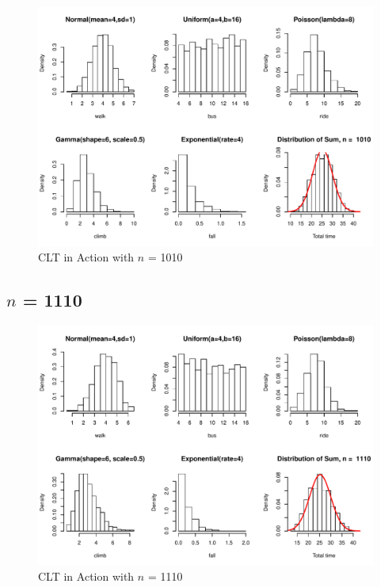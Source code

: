 \documentclass[11pt,letter]{article}\usepackage[]{graphicx}\usepackage[]{color}
\makeatletter
\def\maxwidth{ %
  \ifdim\Gin@nat@width>\linewidth
    \linewidth
  \else
    \Gin@nat@width
  \fi
}
\newenvironment{knitrout}{}{} %
\makeatother
\begin{document}
\begin{knitrout}
\color{fgcolor}\begin{figure}[h]

{\centering \includegraphics[width=\maxwidth]{figure/n-1010-1} 

}

\caption[CLT in Action with ]{CLT in Action with $n$ = 1010}\label{fig:n-1010}
\end{figure}


\end{knitrout}
\newpage
\subsection{$n$ = 1110}

\begin{knitrout}
\color{fgcolor}\begin{figure}[h]

{\centering \includegraphics[width=\maxwidth]{figure/n-1110-1} 

}

\caption[CLT in Action with ]{CLT in Action with $n$ = 1110}\label{fig:n-1110}
\end{figure}


\end{knitrout}
\newpage
\end{document}

